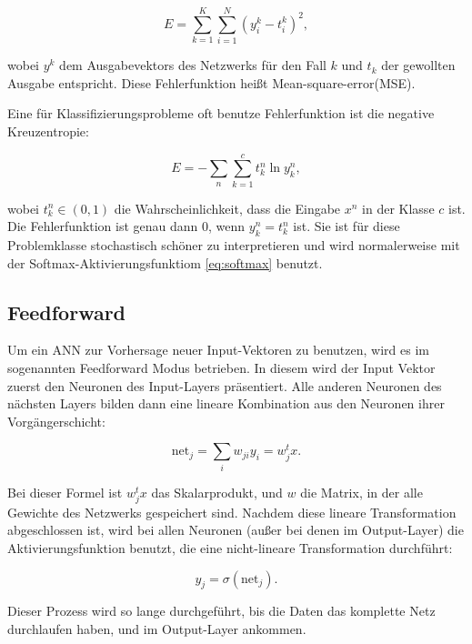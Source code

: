 \begin{equation}
\label{eq:MSE}
E = \sum_{k=1}^K \sum_{i=1}^N \left( y_i^k - t_i^k \right)^2,
\end{equation}

wobei $y^k$ dem Ausgabevektors des Netzwerks für den Fall $k$ und $t_k$ der gewollten Ausgabe entspricht.
Diese Fehlerfunktion heißt  Mean-square-error(MSE)\cite{bishop1995neural}.

Eine für Klassifizierungsprobleme oft benutze Fehlerfunktion ist die negative Kreuzentropie:

\begin{equation}
\label{eq:crossEntropy}
    E = -\sum_{n} \sum_{k=1}^c t_k^n \ln y_k^n ,
\end{equation}

wobei $t_k^n \in (0,1)$ die Wahrscheinlichkeit, dass die Eingabe $x^n$ in der Klasse $c$ ist. Die Fehlerfunktion ist genau dann $0$, wenn $y_k^n = t_k^n$ ist. 
Sie ist für diese Problemklasse stochastisch schöner zu interpretieren und wird normalerweise mit der Softmax-Aktivierungsfunktiom \ref{eq:softmax} benutzt. \cite{bishop1995neural}

\subsection{Feedforward}
Um ein ANN zur Vorhersage neuer Input-Vektoren zu benutzen, wird es im sogenannten Feedforward Modus betrieben. In diesem wird der Input Vektor zuerst den Neuronen des Input-Layers präsentiert. Alle anderen Neuronen des nächsten Layers bilden dann eine lineare Kombination aus den Neuronen ihrer Vorgängerschicht: 

\begin{equation}
\label{eq:feedforward1}
\text{net}_j = \sum_{i} w_{ji} y_i = w_j^t x.
\end{equation}

Bei dieser Formel ist $w_j^t x$ das Skalarprodukt, und $w$ die Matrix, in der alle Gewichte des Netzwerks gespeichert sind.  
Nachdem diese lineare Transformation abgeschlossen ist, wird bei allen Neuronen (außer bei denen im Output-Layer) die Aktivierungsfunktion benutzt, die eine nicht-lineare Transformation durchführt: 

\begin{equation}
\label{eq:feedforward2}
y_j = \sigma (\text{net}_j).
\end{equation}

Dieser Prozess wird so lange durchgeführt, bis die Daten das komplette Netz durchlaufen haben, und im Output-Layer ankommen\cite{bishop1995neural}.


